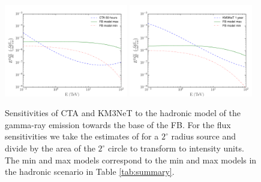 \begin{figure}[h]
\centering
 \includegraphics[width=0.48\textwidth]{plots/low_lat_FB_CTA.pdf}
 \includegraphics[width=0.48\textwidth]{plots/low_lat_FB_KM3.pdf}
 \caption{Sensitivities of CTA and KM3NeT to the hadronic model of the gamma-ray emission towards the base of the FB.
 For the flux sensitivities we take the estimates of \cite{2018APh...100...69A} for a $2^\circ$ radius source and divide by the
 area of the $2^\circ$ circle to transform to intensity units. The min and max models correspond to the min and max models in
 the hadronic scenario in Table \ref{tab:summary}.}
 \label{fig:sensitivities}
\end{figure}


